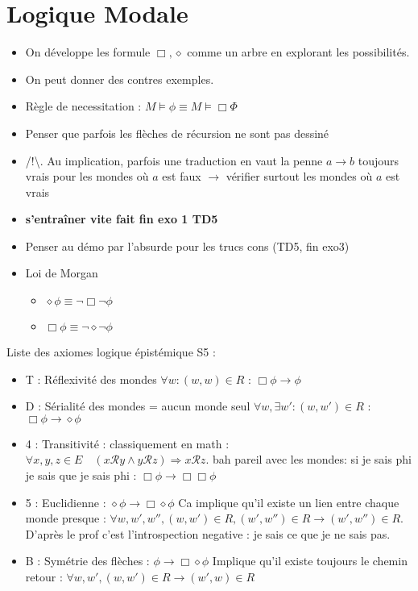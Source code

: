 \documentclass{article}
\theoremstyle{plain}%
\theoremstyle{definition}
\theoremstyle{remark}
\begin{document}
\section{Logique Modale}
\begin{itemize}
    \item On développe les formule $ \Box, \diamond  $ comme un arbre en explorant les possibilités.
    \item On peut donner des contres exemples.
    \item Règle de necessitation : $ M \models \phi \equiv M \models \Box \Phi $ 
    \item Penser que parfois les flèches de récursion ne sont pas dessiné
    \item /!\textbackslash . Au implication, parfois une traduction en vaut la penne $ a \to b $ toujours vrais pour les mondes où $ a $ est faux $\rightarrow$ vérifier surtout les mondes où $ a $ est vrais
    \item \textbf{s'entraîner vite fait fin exo 1 TD5}
    \item Penser au démo par l'absurde pour les trucs cons (TD5, fin exo3)
    \item Loi de Morgan \begin{itemize}
        \item $ \diamond \phi \equiv \neg \Box \neg \phi  $ 
        \item $ \Box \phi \equiv \neg \diamond \neg \phi  $ 
    \end{itemize}
\end{itemize}
Liste des axiomes logique épistémique S5 :
\begin{itemize}
    \item T : Réflexivité des mondes $ \forall w : (w,w) \in R $ : $ \Box \phi \to \phi  $ 
    \item D : Sérialité des mondes = aucun monde seul $ \forall w, \exists w' : (w, w') \in R $  : $ \Box \phi \to \diamond \phi  $ 
    \item 4 : Transitivité : classiquement en math : $ \forall x,y,z\in E\quad (x{\mathcal {R}}y\land y{\mathcal {R}}z)\Rightarrow x{\mathcal {R}}z. $ bah pareil avec les mondes: si je sais phi je sais que je sais phi : $ \Box \phi \to \Box \Box \phi  $ 
    \item 5 : Euclidienne : $ \diamond \phi  \to  \Box \diamond \phi  $ Ca implique qu'il existe un lien entre chaque monde presque : $ \forall w, w', w'', (w, w') \in R, (w',w'') \in R \to (w',w'') \in R $. D'après le prof c'est l'introspection negative : je sais ce que je ne sais pas.
    \item B : Symétrie des flèches : $ \phi \to \Box \diamond \phi  $ Implique qu'il existe toujours le chemin retour : $ \forall w, w', (w,w') \in R \to (w',w) \in R $ 
\end{itemize}
\end{document}
